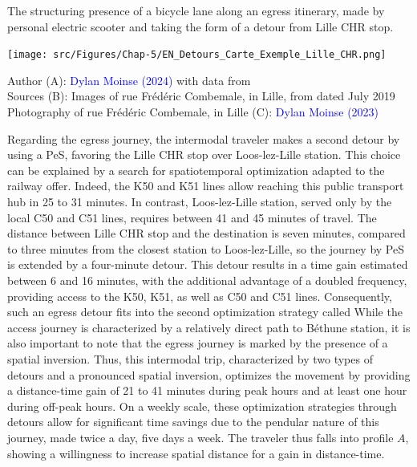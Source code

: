 \begin{refsegment}
    \begin{carte}[h!]\vspace*{4pt}
        \caption{The structuring presence of a bicycle lane along an egress itinerary, made by personal electric scooter and taking the form of a detour from Lille CHR stop.}
        \label{fig-chap5:exemple-detours-lille-chr}
        \centerline{\texttt{[image: src/Figures/Chap-5/EN\_Detours\_Carte\_Exemple\_Lille\_CHR.png]}}
        \vspace{5pt}
        \begin{flushright}\scriptsize{
        Author (A): \textcolor{blue}{Dylan Moinse (2024)} with data from \textcolor{blue}{\textcite{openstreetmap_openstreetmap_2023}}
        \\
        Sources (B): Images of rue Frédéric Combemale, in Lille, from  dated July 2019
        \\
        Photography of rue Frédéric Combemale, in Lille (C): \textcolor{blue}{Dylan Moinse (2023)}
        }\end{flushright}
    \end{carte}
    
Regarding the egress journey, the intermodal traveler makes a second detour by using a \acrshort{PeS}, favoring the Lille CHR stop over Loos-lez-Lille station. This choice can be explained by a search for spatiotemporal optimization adapted to the railway offer. Indeed, the K50 and K51 lines allow reaching this public transport hub in 25 to 31 minutes. In contrast, Loos-lez-Lille station, served only by the local C50 and C51 lines, requires between 41 and 45 minutes of travel. The distance between Lille CHR stop and the destination is seven minutes, compared to three minutes from the closest station to Loos-lez-Lille, so the journey by \acrshort{PeS} is extended by a four-minute detour. This detour results in a time gain estimated between 6 and 16 minutes, with the additional advantage of a doubled frequency, providing access to the K50, K51, as well as C50 and C51 lines. Consequently, such an egress detour fits into the second optimization strategy called  While the access journey is characterized by a relatively direct path to Béthune station, it is also important to note that the egress journey is marked by the presence of a spatial inversion. Thus, this intermodal trip, characterized by two types of detours and a pronounced spatial inversion, optimizes the movement by providing a distance-time gain of 21 to 41 minutes during peak hours and at least one hour during off-peak hours. On a weekly scale, these optimization strategies through detours allow for significant time savings due to the pendular nature of this journey, made twice a day, five days a week. The traveler thus falls into profile \(A\), showing a willingness to increase spatial distance for a gain in distance-time.%


\end{refsegment}
